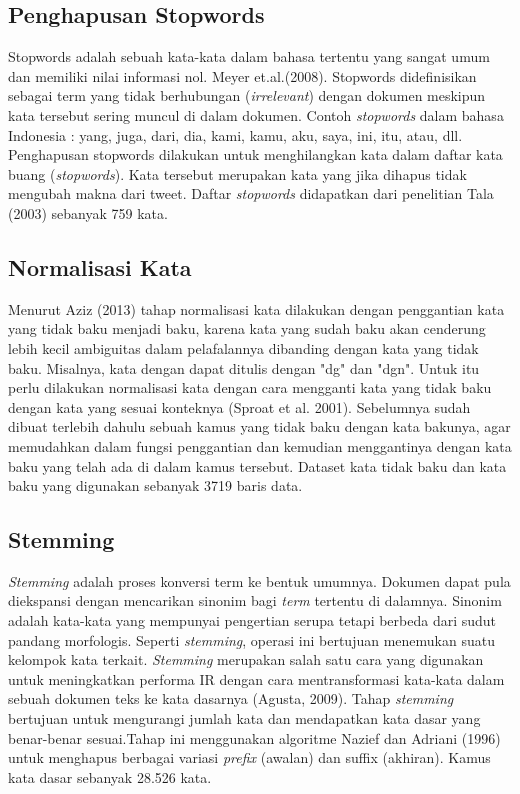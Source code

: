 \subsection*{Penghapusan Stopwords}

Stopwords adalah sebuah kata-kata dalam bahasa tertentu yang sangat umum dan memiliki nilai informasi nol. Meyer et.al.(2008). Stopwords didefinisikan sebagai term yang tidak berhubungan (\textit{irrelevant}) dengan dokumen meskipun kata tersebut sering muncul di dalam dokumen. Contoh \textit{stopwords} dalam bahasa  Indonesia : yang, juga, dari, dia, kami, kamu, aku, saya, ini, itu, atau, dll.
Penghapusan stopwords dilakukan untuk menghilangkan kata dalam daftar kata buang (\textit{stopwords}). Kata tersebut merupakan kata yang jika dihapus tidak mengubah makna dari tweet. Daftar \textit{stopwords} didapatkan dari penelitian Tala (2003) sebanyak 759 kata.


\subsection*{Normalisasi Kata}

Menurut Aziz (2013) tahap normalisasi kata dilakukan dengan penggantian kata yang tidak baku menjadi baku, karena kata yang sudah baku akan cenderung lebih kecil ambiguitas dalam pelafalannya dibanding dengan kata yang tidak baku. Misalnya, kata dengan dapat ditulis dengan "dg" dan "dgn".  Untuk itu perlu dilakukan normalisasi kata dengan cara mengganti kata yang tidak baku dengan kata yang sesuai konteknya (Sproat et al. 2001). Sebelumnya sudah dibuat terlebih dahulu sebuah kamus yang tidak baku dengan kata bakunya, agar memudahkan dalam fungsi penggantian dan kemudian menggantinya dengan kata baku yang telah ada di dalam kamus tersebut. Dataset kata tidak baku dan kata baku yang digunakan sebanyak 3719 baris data. 

\subsection*{Stemming}

\textit{Stemming} adalah  proses  konversi term ke bentuk  umumnya. Dokumen dapat pula diekspansi dengan mencarikan  sinonim  bagi \textit{term} tertentu di  dalamnya. Sinonim adalah kata-kata yang mempunyai pengertian serupa tetapi berbeda dari sudut pandang morfologis. Seperti \textit{stemming},  operasi ini bertujuan menemukan suatu kelompok kata terkait.
\textit{Stemming} merupakan salah satu cara yang digunakan untuk meningkatkan performa IR dengan cara mentransformasi kata-kata dalam sebuah dokumen teks ke kata dasarnya (Agusta, 2009). Tahap \textit{stemming} bertujuan untuk mengurangi jumlah kata dan mendapatkan kata dasar yang benar-benar sesuai.Tahap ini menggunakan algoritme Nazief dan Adriani (1996) untuk menghapus berbagai variasi \textit{prefix} (awalan) dan suffix (akhiran). Kamus kata dasar sebanyak 28.526 kata.

